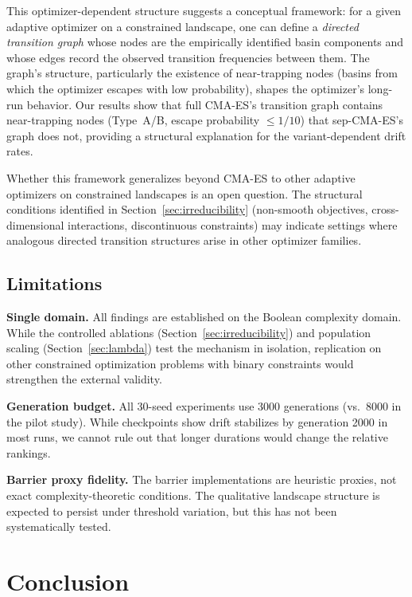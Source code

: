 \documentclass[twoside]{article}
\begin{document}
This optimizer-dependent structure suggests a conceptual framework:
for a given adaptive optimizer on a constrained landscape, one can
define a \emph{directed transition graph} whose nodes are the
empirically identified basin components and whose edges record the
observed transition frequencies between them. The graph's
structure, particularly the existence of near-trapping nodes (basins
from which the optimizer escapes with low probability), shapes the
optimizer's long-run behavior. Our results show that full CMA-ES's
transition graph contains near-trapping nodes (Type~A/B, escape
probability $\leq 1/10$) that sep-CMA-ES's graph does not, providing
a structural explanation for the variant-dependent drift rates.

Whether this framework generalizes beyond CMA-ES to other adaptive
optimizers on constrained landscapes is an open question. The structural
conditions identified in Section~\ref{sec:irreducibility} (non-smooth
objectives, cross-dimensional interactions, discontinuous
constraints) may indicate settings where analogous directed transition
structures arise in other optimizer families.

\subsection{Limitations}

\textbf{Single domain.} All findings are established on the Boolean complexity
domain. While the controlled ablations (Section~\ref{sec:irreducibility}) and
population scaling (Section~\ref{sec:lambda}) test the mechanism in isolation,
replication on other constrained optimization problems with binary constraints
would strengthen the external validity.

\textbf{Generation budget.} All 30-seed experiments use 3000 generations
(vs.\ 8000 in the pilot study). While checkpoints show drift stabilizes by
generation 2000 in most runs, we cannot rule out that longer durations would
change the relative rankings.

\textbf{Barrier proxy fidelity.} The barrier implementations are heuristic
proxies, not exact complexity-theoretic conditions. The qualitative landscape
structure is expected to persist under threshold variation, but this has not
been systematically tested.

\section{Conclusion}
\label{sec:conclusion}
\end{document}
